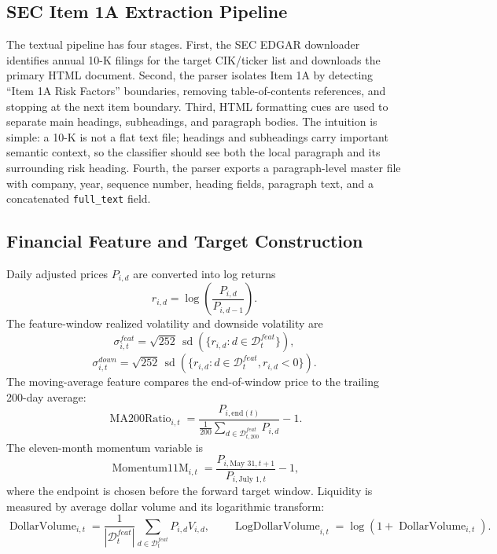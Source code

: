 \documentclass[11pt, a4paper]{article}
\begin{document}
\subsection{SEC Item 1A Extraction Pipeline}
The textual pipeline has four stages. First, the SEC EDGAR downloader identifies annual 10-K filings for the target CIK/ticker list and downloads the primary HTML document. Second, the parser isolates Item 1A by detecting ``Item 1A Risk Factors'' boundaries, removing table-of-contents references, and stopping at the next item boundary. Third, HTML formatting cues are used to separate main headings, subheadings, and paragraph bodies. The intuition is simple: a 10-K is not a flat text file; headings and subheadings carry important semantic context, so the classifier should see both the local paragraph and its surrounding risk heading. Fourth, the parser exports a paragraph-level master file with company, year, sequence number, heading fields, paragraph text, and a concatenated \texttt{full\_text} field.

\subsection{Financial Feature and Target Construction}
Daily adjusted prices $P_{i,d}$ are converted into log returns
\begin{equation}
r_{i,d}=\log\left(\frac{P_{i,d}}{P_{i,d-1}}\right).
\end{equation}
The feature-window realized volatility and downside volatility are
\begin{equation}
\sigma^{feat}_{i,t}=\sqrt{252}\,\operatorname{sd}\left(\{r_{i,d}:d\in\mathcal{D}^{feat}_{t}\}\right),
\end{equation}
\begin{equation}
\sigma^{down}_{i,t}=\sqrt{252}\,\operatorname{sd}\left(\{r_{i,d}:d\in\mathcal{D}^{feat}_{t}, r_{i,d}<0\}\right).
\end{equation}
The moving-average feature compares the end-of-window price to the trailing 200-day average:
\begin{equation}
\operatorname{MA200Ratio}_{i,t}=\frac{P_{i,\text{end}(t)}}{\frac{1}{200}\sum_{d\in\mathcal{D}^{feat}_{t,200}}P_{i,d}}-1.
\end{equation}
The eleven-month momentum variable is
\begin{equation}
\operatorname{Momentum11M}_{i,t}=\frac{P_{i,\text{May }31,t+1}}{P_{i,\text{July }1,t}}-1,
\end{equation}
where the endpoint is chosen before the forward target window. Liquidity is measured by average dollar volume and its logarithmic transform:
\begin{equation}
\operatorname{DollarVolume}_{i,t}=\frac{1}{|\mathcal{D}^{feat}_{t}|}\sum_{d\in\mathcal{D}^{feat}_{t}}P_{i,d}V_{i,d},\qquad
\operatorname{LogDollarVolume}_{i,t}=\log\left(1+\operatorname{DollarVolume}_{i,t}\right).
\end{equation}
\end{document}
